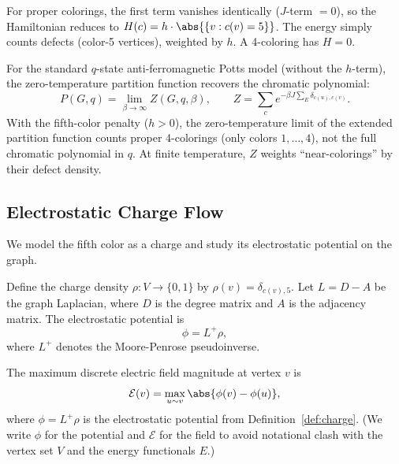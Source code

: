 For proper colorings, the first term vanishes identically ($J$-term
$= 0$), so the Hamiltonian reduces to
$H(c) = h \cdot \abs{\{v : c(v) = 5\}}$. The energy simply counts
defects (color-5 vertices), weighted by $h$. A 4-coloring has $H = 0$.

\begin{remark}\label{rem:potts-chromatic}
For the standard $q$-state anti-ferromagnetic Potts model (without
the $h$-term), the zero-temperature partition function recovers the
chromatic polynomial:
\begin{equation}
  P(G, q) = \lim_{\beta \to \infty} Z(G, q, \beta),
    \qquad
  Z = \sum_c e^{-\beta J \sum_{E} \delta_{c(u),c(v)}}.
\end{equation}
With the fifth-color penalty ($h > 0$), the zero-temperature limit
of the extended partition function counts proper 4-colorings (only
colors $1, \ldots, 4$), not the full chromatic polynomial in $q$.
At finite temperature, $Z$ weights ``near-colorings'' by their defect
density.
\end{remark}

\subsection{Electrostatic Charge Flow}\label{sec:electrostatic}

We model the fifth color as a charge and study its electrostatic
potential on the graph.

\begin{definition}\label{def:charge}
Define the charge density $\rho \colon V \to \{0, 1\}$ by
$\rho(v) = \delta_{c(v), 5}$. Let $L = D - A$ be the graph Laplacian,
where $D$ is the degree matrix and $A$ is the adjacency matrix. The
electrostatic potential is
\begin{equation}\label{eq:potential}
  \phi = L^+ \rho,
\end{equation}
where $L^+$ denotes the Moore-Penrose pseudoinverse.
\end{definition}

\begin{definition}\label{def:e-field}
The maximum discrete electric field magnitude at vertex $v$ is
\begin{equation}\label{eq:e-field}
  \mathcal{E}(v) = \max_{u \sim v} \abs{\phi(v) - \phi(u)},
\end{equation}
where $\phi = L^+ \rho$ is the electrostatic potential from
Definition~\ref{def:charge}. (We write $\phi$ for the potential and
$\mathcal{E}$ for the field to avoid notational clash with the vertex
set $V$ and the energy functionals $E$.)
\end{definition}

